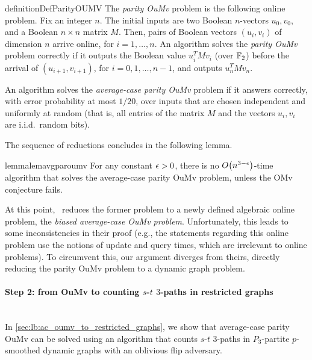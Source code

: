 \documentclass[letter,11pt]{article}
\newcommand{\omv}{\textnormal{\textsf{OMv}}\xspace}
\newcommand{\oumv}{\textnormal{\textsf{OuMv}}\xspace}
\newcommand{\paths}[3]{${#1}$-${#2}$ ${#3}$-paths\xspace}
\begin{document}
\begin{restatable}[parity \oumv problem]{definition}{DefParityOUMV}
	The \emph{parity \oumv} problem is the following online problem. Fix an integer $n$. The initial inputs are two Boolean $n$-vectors $u_0, v_0$, and a Boolean $n\times n$ matrix $M$.
	Then, pairs of Boolean vectors $(u_i, v_i)$ of dimension $n$ arrive online, for $i=1,\dots, n$.
	An algorithm solves the \emph{parity \oumv} problem correctly if it outputs the Boolean value $u_i^T M v_i$ (over $\mathbb{F}_2$) before the arrival of $(u_{i+1},v_{i+1})$, for $i = 0,1,\dots, n-1$, and outputs $u_n^T M v_n$.
	
	An algorithm solves the \emph{average-case parity \oumv} problem if it answers correctly, with error probability at most $1/20$, over inputs that are chosen independent and uniformly at random (that is, all entries of the matrix $M$ and the vectors $u_i, v_i$ are i.i.d.\ random bits).
\end{restatable}

The sequence of reductions concludes in the following lemma.

\begin{restatable}{lemma}{lemavgparoumv}
\label{lem:conjecture_to_ac_oumv}
    For any constant $\epsilon > 0$, there is no $O\left(n
	^{3-\eps}\right)$-time algorithm that solves
	the average-case parity \oumv problem, unless the \omv conjecture fails.
\end{restatable}

\begin{remark}
    At this point,~\cite[Section~2.1]{HLS22} reduces the former problem to a newly defined algebraic online problem, the \emph{biased average-case \oumv problem}.
    Unfortunately, this leads to some inconsistencies in their proof (e.g., the statements regarding this online problem use the notions of update and query times, which are irrelevant to online problems).
    To circumvent this,
    our argument diverges from theirs, directly reducing the parity \oumv problem to a dynamic graph problem.
\end{remark}



\paragraph{Step 2: from \oumv to counting \paths{s}{t}{3} in restricted graphs}~\\
In \cref{sec:lb:ac_oumv_to_restricted_graphs},
we show that average-case parity \oumv can be solved using an algorithm that counts \paths{s}{t}{3} in $P_3$-partite $p$-smoothed dynamic graphs
with an oblivious flip adversary.
\end{document}
